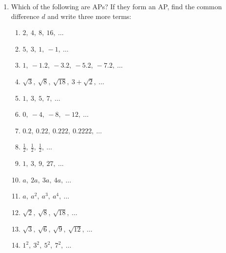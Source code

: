 \documentclass[12pt]{article}
\begin{document}
\begin{enumerate}
\item Which of the following are APs? If they form an AP, find the common difference \( d \) and write three more terms:

\begin{multicols}{2}
\begin{enumerate}[label=(\alph*)]
    \item \( 2,\ 4,\ 8,\ 16,\ \ldots \)
    \item \( 5,\ 3,\ 1,\ -1,\ \ldots \)
    \item \( 1,\ -1.2,\ -3.2,\ -5.2,\ -7.2,\ \ldots \)
    \item \( \sqrt{3},\ \sqrt{8},\ \sqrt{18},\ 3 + \sqrt{2},\ \ldots \)
    \item \( 1,\ 3,\ 5,\ 7,\ \ldots \)
    \item \( 0,\ -4,\ -8,\ -12,\ \ldots \)
    \item \( 0.2,\ 0.22,\ 0.222,\ 0.2222,\ \ldots \)
    \item \( \frac{1}{2},\ \frac{1}{2},\ \frac{1}{2},\ \ldots \)
    \item \( 1,\ 3,\ 9,\ 27,\ \ldots \)
    \item \( a,\ 2a,\ 3a,\ 4a,\ \ldots \)
    \item \( a,\ a^2,\ a^3,\ a^4,\ \ldots \)
    \item \( \sqrt{2},\ \sqrt{8},\ \sqrt{18},\ \ldots \)
    \item \( \sqrt{3},\ \sqrt{6},\ \sqrt{9},\ \sqrt{12},\ \ldots \)
    \item \( 1^2,\ 3^2,\ 5^2,\ 7^2,\ \ldots \)
\end{enumerate}
\end{multicols}
\end{enumerate}

\vspace{0.5em}
\end{document}
